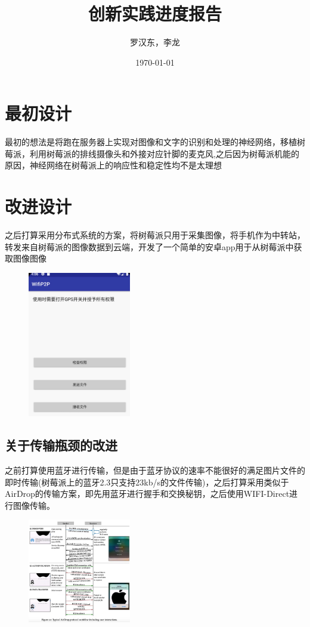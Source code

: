 \documentclass[twocolumn,a4,UTF8]{ctexart}
\title{创新实践进度报告}
\author{罗汉东，李龙}
\date{\today}
\begin{document}
  \maketitle
  \tableofcontents
  \section{最初设计}
 最初的想法是将跑在服务器上实现对图像和文字的识别和处理的神经网络，移植树莓派，利用树莓派的排线摄像头和外接对应针脚的麦克风,之后因为树莓派机能的原因，神经网络在树莓派上的响应性和稳定性均不是太理想
 \section{改进设计}
 	之后打算采用分布式系统的方案，将树莓派只用于采集图像，将手机作为中转站，转发来自树莓派的图像数据到云端，开发了一个简单的安卓app用于从树莓派中获取图像图像
 	\begin{figure}[H] 
	\centering 
	\includegraphics[width=0.4\textwidth]{app.png} 
	\end{figure}
 	\subsection{关于传输瓶颈的改进}
 	之前打算使用蓝牙进行传输，但是由于蓝牙协议的速率不能很好的满足图片文件的即时传输(树莓派上的蓝牙2.3只支持23kb/s的文件传输)，之后打算采用类似于AirDrop的传输方案，即先用蓝牙进行握手和交换秘钥，之后使用WIFI-Direct进行图像传输。
 	\begin{figure}[H] 
	\centering 
	\includegraphics[width=0.4\textwidth]{AirDrop.png} 
	\end{figure}
\end{document}

